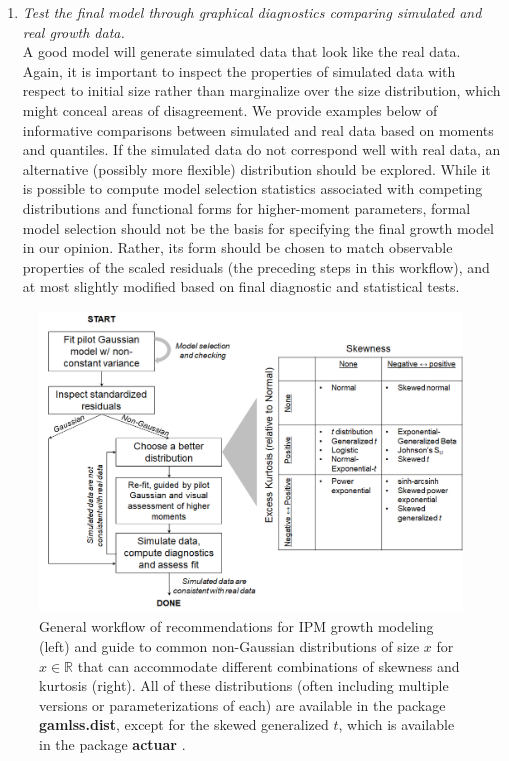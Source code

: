 \documentclass[11pt]{article}
\begin{document}
{\begin{enumerate}
\item \textit{Test the final model through graphical diagnostics comparing simulated and real growth data.} 
\\
A good model will generate simulated data that look like the real data.  
Again, it is important to inspect the properties of simulated data with respect to initial size rather than marginalize over the size distribution, which might conceal areas of disagreement. 
We provide examples below of informative comparisons between simulated and real data based on moments and quantiles. 
If the simulated data do not correspond well with real data, an alternative (possibly more flexible) distribution should be explored. 
While it is possible to compute model selection statistics associated with competing distributions and functional forms for higher-moment parameters, formal  model selection should not be the basis for specifying the final growth model in our opinion. 
Rather, its form should be chosen to match observable properties of the scaled residuals (the preceding steps in this workflow), and at most slightly modified based on final diagnostic and statistical tests.

\end{enumerate}

\begin{figure}
\centering
\includegraphics[width=\textwidth]{figures/workflow}
\caption{General workflow of recommendations for IPM growth modeling (left) and guide to common non-Gaussian distributions of size $x$ for $x \in \mathbb{R}$ that can accommodate different combinations of skewness and kurtosis (right). 
All of these distributions (often including multiple versions or parameterizations of each) are available in the package \textbf{gamlss.dist}, except for the skewed generalized $t$, which is available in the package \textbf{actuar} \citep{dutang2008actuar}.}
\label{fig:workflow}
\end{figure} 

}
\end{document}
